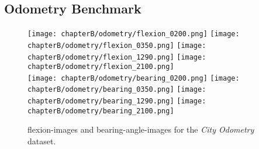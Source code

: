 \subsection{Odometry Benchmark}
\begin{figure}[H]
    \texttt{[image: chapterB/odometry/flexion\_0200.png]}%
    \texttt{[image: chapterB/odometry/flexion\_0350.png]}%
    \texttt{[image: chapterB/odometry/flexion\_1290.png]}%
    \texttt{[image: chapterB/odometry/flexion\_2100.png]}\\
    \texttt{[image: chapterB/odometry/bearing\_0200.png]}%
    \texttt{[image: chapterB/odometry/bearing\_0350.png]}%
    \texttt{[image: chapterB/odometry/bearing\_1290.png]}%
    \texttt{[image: chapterB/odometry/bearing\_2100.png]}\\
    \caption{\glspl{flexion-image} and \glspl{bearing-angle-image} for the \emph{City Odometry} dataset.}
\end{figure}
